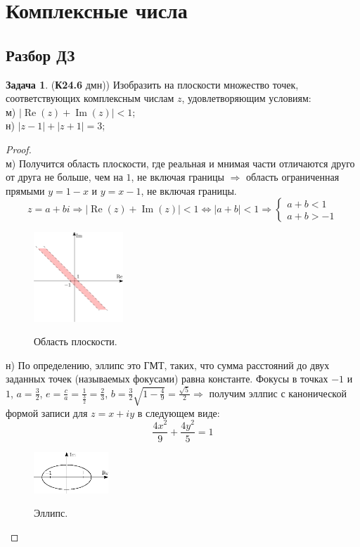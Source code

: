 \documentclass[12pt]{article}
\newcommand{\RN}[1]{%
	\textup{\uppercase\expandafter{\romannumeral#1}}%
}
\theoremstyle{definition}
\newtheorem{problem}{Задача}
\DeclareMathOperator{\IM}{\operatorname{Im}}
\DeclareMathOperator{\RE}{\operatorname{Re}}
\begin{document}
\lhead{Алгебра-\RN{1}}
\section*{Комплексные числа}
\subsection*{Разбор ДЗ}
\begin{problem}(\textbf{К24.6} дмн))
	Изобразить на плоскости множество точек, соответствующих комплексным числам $z$, удовлетворяющим условиям:\\
	м) $|\RE(z) + \IM(z)| < 1$;\\
	н) $|z-1| + |z +1| = 3$;
\end{problem}
\begin{proof}\hfill\\
	м) Получится область плоскости, где реальная и мнимая части отличаются друго от друга не больше, чем на $1$, не включая границы $\Rightarrow$ область ограниченная прямыми $y = 1 - x$ и $y = x -1$, не включая границы.
	$$
		z = a+ bi \Rightarrow |\RE(z) + \IM(z)| < 1 \Leftrightarrow |a + b| < 1 \Rightarrow 
		\begin{cases}
			a + b < 1\\
			a + b > -1
		\end{cases}
	$$
	\begin{figure}[H]
		\centering
		\includegraphics[width=0.3\textwidth]{AL1S2_1.png}
		\label{2_1}
		\caption{Область плоскости.}
	\end{figure}

	н) По определению, эллипс это ГМТ, таких, что сумма расстояний до двух заданных точек (называемых фокусами) равна константе. Фокусы в точках $-1$ и $1$, $a = \tfrac{3}{2}$, $e = \tfrac{c}{a} = \tfrac{1}{\tfrac{3}{2}} = \tfrac{2}{3}$, $b = \tfrac{3}{2}\sqrt{1- \tfrac{4}{9}} = \tfrac{\sqrt{5}}{2} \Rightarrow$ получим эллпис с канонической формой записи для $z = x + iy$ в следующем виде:
	$$
		\dfrac{4x^2}{9} + \dfrac{4y^2}{5} = 1
	$$
	\begin{figure}[H]
		\centering
		\includegraphics[width=0.25\textwidth]{AL1S2_2.eps}
		\label{2_2}
		\caption{Эллипс.}
	\end{figure}
\end{proof}
\end{document}
